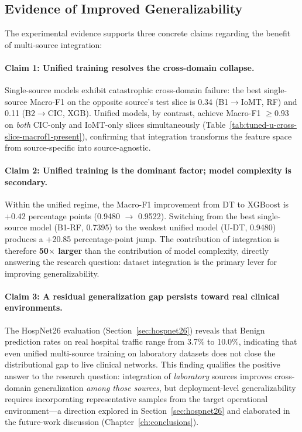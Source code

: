 \subsection{Evidence of Improved Generalizability}
\label{subsec:improved-coverage}

The experimental evidence supports three concrete claims regarding the benefit of multi-source integration:

\paragraph{Claim 1: Unified training resolves the cross-domain collapse.}
Single-source models exhibit catastrophic cross-domain failure: the best single-source Macro-F1 on the opposite source's test slice is 0.34 (B1$\to$IoMT, RF) and 0.11 (B2$\to$CIC, XGB). Unified models, by contrast, achieve Macro-F1 $\geq 0.93$ on \emph{both} CIC-only and IoMT-only slices simultaneously (Table~\ref{tab:tuned-u-cross-slice-macrof1-present}), confirming that integration transforms the feature space from source-specific into source-agnostic.

\paragraph{Claim 2: Unified training is the dominant factor; model complexity is secondary.}
Within the unified regime, the Macro-F1 improvement from DT to XGBoost is +0.42 percentage points (0.9480 $\to$ 0.9522). Switching from the best single-source model (B1-RF, 0.7395) to the weakest unified model (U-DT, 0.9480) produces a +20.85 percentage-point jump. The contribution of integration is therefore \textbf{50$\times$ larger} than the contribution of model complexity, directly answering the research question: dataset integration is the primary lever for improving generalizability.

\paragraph{Claim 3: A residual generalization gap persists toward real clinical environments.}
The HospNet26 evaluation (Section~\ref{sec:hospnet26}) reveals that Benign prediction rates on real hospital traffic range from 3.7\% to 10.0\%, indicating that even unified multi-source training on laboratory datasets does not close the distributional gap to live clinical networks. This finding qualifies the positive answer to the research question: integration of \emph{laboratory} sources improves cross-domain generalization \emph{among those sources}, but deployment-level generalizability requires incorporating representative samples from the target operational environment---a direction explored in Section~\ref{sec:hospnet26} and elaborated in the future-work discussion (Chapter~\ref{ch:conclusions}).

